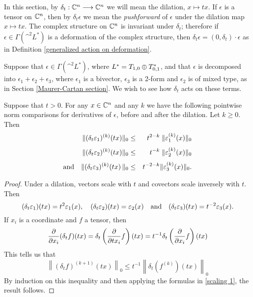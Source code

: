 \documentclass{article}
\begin{document}
In this section, by $\delta_t : \C^n \to \C^n$ we will mean the dilation, $x \mapsto tx$.  If $\epsilon$ is a tensor on $\C^n$, then by $\delta_t \epsilon$ we mean the \emph{pushforward} of $\epsilon$ under the dilation map $x \mapsto tx$.  The complex structure on $\C^n$ is invariant under $\delta_t$; therefore if $\epsilon \in \Gamma(\^ ^2 L^*)$ is a deformation of the complex structure, then $\delta_t \epsilon = (0,\delta_t)\cdot\epsilon$ as in Definition \ref{generalized action on deformation}.

Suppose that $\epsilon \in \Gamma(\^ ^2 L^*)$, where $L^* = T_{1,0} \dsum T^*_{0,1}$, and that $\epsilon$ is decomposed into $\epsilon_1 + \epsilon_2 + \epsilon_3$, where $\epsilon_1$ is a bivector, $\epsilon_3$ is a 2-form and $\epsilon_2$ is of mixed type, as in Section \ref{Maurer-Cartan section}.  We wish to see how $\delta_t$ acts on these terms.

\begin{prop}\label{delta action}
Suppose that $t>0$.  For any $x \in \C^n$ and any $k$ we have the following pointwise norm comparisons for derivatives of $\epsilon$, before and after the dilation.  Let $k\geq0$.  Then
\begin{eqnarray*}
\|(\delta_t\epsilon_1)^{(k)}(tx)\|_0 &\leq& t^{2-k}\;\|\epsilon_1^{(k)}(x)\|_0 \\[3pt]
\quad \|(\delta_t\epsilon_2)^{(k)}(tx)\|_0 &\leq& \;t^{-k}\;\|\epsilon_2^{(k)}(x)\|_0 \\[3pt]
\textnormal{and}\quad \|(\delta_t\epsilon_3)^{(k)}(tx)\,\|_0 &\leq& t^{-2-k}\|\epsilon_3^{(k)}(x)\|_0.
\end{eqnarray*}
\end{prop}

\begin{proof}
Under a dilation, vectors scale with $t$ and covectors scale inversely with $t$.  Then
\begin{equation}\label{scaling 1}
(\delta_t\epsilon_1)(tx) = t^2\epsilon_1(x), \quad (\delta_t\epsilon_2)(tx) = \epsilon_2(x)
\quad\textnormal{and}\quad (\delta_t\epsilon_3)(tx) = t^{-2}\epsilon_3(x).
\end{equation}
If $x_i$ is a coordinate and $f$ a tensor, then
$$\frac{\del}{\del x_i}(\delta_t f)(tx) = \delta_t\left(\frac{\del}{\del tx_i} f\right)(tx)
= t^{-1}\delta_t\left(\frac{\del}{\del x_i} f\right)(tx)$$
This tells us that
$$\left\|(\delta_t f)^{(k+1)}(tx)\right\|_0
\leq t^{-1}\left\|\delta_t\left(f^{(k)}\right)(tx) \right\|_0$$
By induction on this inequality and then applying the formulas in \eqref{scaling 1}, the result follows.
\end{proof}
\end{document}
